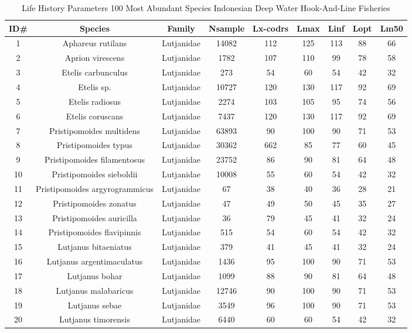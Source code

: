 \documentclass{report}\usepackage[]{graphicx}\usepackage[]{color}
\begin{document}
{\small
\begin{longtable}{ccccccccc}
\caption{Life History Parameters 100 Most Abundant Species Indonesian Deep Water Hook-And-Line Fisheries} \\ 
  \hline
ID\# & Species & Family & Nsample & Lx-codrs & Lmax & Linf & Lopt & Lm50 \\ 
  \hline
1 & Aphareus rutilans & Lutjanidae & 14082 & 112 & 125 & 113 & 88 & 66 \\ 
  2 & Aprion virescens & Lutjanidae & 1782 & 107 & 110 & 99 & 78 & 58 \\ 
  3 & Etelis carbunculus & Lutjanidae & 273 & 54 & 60 & 54 & 42 & 32 \\ 
  4 & Etelis sp. & Lutjanidae & 10727 & 120 & 130 & 117 & 92 & 69 \\ 
  5 & Etelis radiosus & Lutjanidae & 2274 & 103 & 105 & 95 & 74 & 56 \\ 
  6 & Etelis coruscans & Lutjanidae & 7437 & 120 & 130 & 117 & 92 & 69 \\ 
  7 & Pristipomoides multidens & Lutjanidae & 63893 & 90 & 100 & 90 & 71 & 53 \\ 
  8 & Pristipomoides typus & Lutjanidae & 30362 & 662 & 85 & 77 & 60 & 45 \\ 
  9 & Pristipomoides filamentosus & Lutjanidae & 23752 & 86 & 90 & 81 & 64 & 48 \\ 
  10 & Pristipomoides sieboldii & Lutjanidae & 10008 & 55 & 60 & 54 & 42 & 32 \\ 
  11 & Pristipomoides argyrogrammicus & Lutjanidae & 67 & 38 & 40 & 36 & 28 & 21 \\ 
  12 & Pristipomoides zonatus & Lutjanidae & 47 & 49 & 50 & 45 & 35 & 27 \\ 
  13 & Pristipomoides auricilla & Lutjanidae & 36 & 79 & 45 & 41 & 32 & 24 \\ 
  14 & Pristipomoides flavipinnis & Lutjanidae & 515 & 54 & 60 & 54 & 42 & 32 \\ 
  15 & Lutjanus bitaeniatus & Lutjanidae & 379 & 41 & 45 & 41 & 32 & 24 \\ 
  16 & Lutjanus argentimaculatus & Lutjanidae & 1436 & 95 & 100 & 90 & 71 & 53 \\ 
  17 & Lutjanus bohar & Lutjanidae & 1099 & 88 & 90 & 81 & 64 & 48 \\ 
  18 & Lutjanus malabaricus & Lutjanidae & 12746 & 90 & 100 & 90 & 71 & 53 \\ 
  19 & Lutjanus sebae & Lutjanidae & 3549 & 96 & 100 & 90 & 71 & 53 \\ 
  20 & Lutjanus timorensis & Lutjanidae & 6440 & 60 & 60 & 54 & 42 & 32 \\ 

\end{longtable}}
\end{document}
